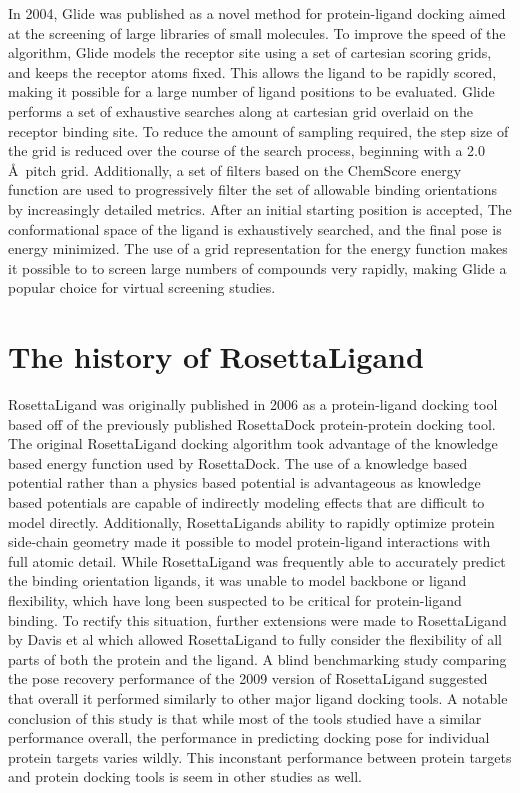 In 2004, Glide\citep{Friesner:2004hm} was published as a novel method for protein-ligand docking aimed at the screening of large libraries of small molecules.
To improve the speed of the algorithm, Glide models the receptor site using a set of cartesian scoring grids, and keeps the receptor atoms fixed.
This allows the ligand to be rapidly scored, making it possible for a large number of ligand positions to be evaluated.
Glide performs a set of exhaustive searches along at cartesian grid overlaid on the receptor binding site.
To reduce the amount of sampling required, the step size of the grid is reduced over the course of the search process, beginning with a 2.0 \AA\ pitch grid.
Additionally, a set of filters based on the ChemScore\citep{Eldridge:1997tm} energy function are used to progressively filter the set of allowable binding orientations by increasingly detailed metrics.
After an initial starting position is accepted, The conformational space of the ligand is exhaustively searched, and the final pose is energy minimized.
The use of a grid representation for the energy function makes it possible to to screen large numbers of compounds very rapidly, making Glide a popular choice for virtual screening studies\citep{Yilmaz:2013dj,Bauer:2013de}.

\section{The history of RosettaLigand}
RosettaLigand was originally published in 2006\citep{Meiler:2006vj} as a protein-ligand docking tool based off of the previously published RosettaDock\citep{Gray:2003uk} protein-protein docking tool.
The original RosettaLigand docking algorithm took advantage of the knowledge based energy function used by RosettaDock.
The use of a knowledge based potential rather than a physics based potential is advantageous as knowledge based potentials are capable of indirectly modeling effects that are difficult to model directly. %
Additionally, RosettaLigands ability to rapidly optimize protein side-chain geometry\citep{Barth:2007cw} made it possible to model protein-ligand interactions with full atomic detail.
While RosettaLigand was frequently able to accurately predict the binding orientation ligands\citep{Meiler:2006vj}, it was unable to model backbone or ligand flexibility, which have long been suspected to be critical for protein-ligand binding\citep{Yang:2014dm,KOSHLAND:1958wa}.
To rectify this situation, further extensions were made to RosettaLigand by Davis et al\citep{Davis:2009bf} which allowed RosettaLigand to fully consider the flexibility of all parts of both the protein and the ligand.
A blind benchmarking study comparing the pose recovery performance of the 2009 version of RosettaLigand suggested that overall it performed similarly to other major ligand docking tools\citep{Davis:2009fx}.
A notable conclusion of this study is that while most of the tools studied have a similar performance overall, the performance in predicting docking pose for individual protein targets varies wildly.
This inconstant performance between protein targets and protein docking tools is seem in other studies as well. 

